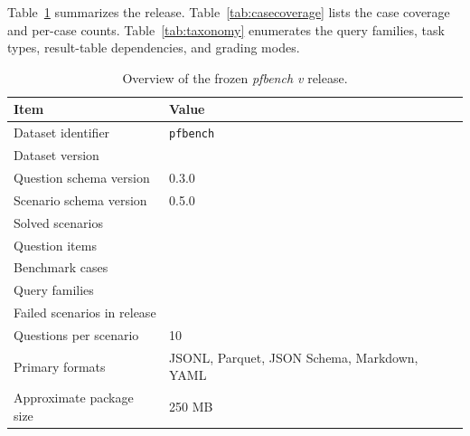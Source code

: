 Table~\ref{tab:overview} summarizes the release. Table~\ref{tab:casecoverage} lists the case coverage and per-case counts. Table~\ref{tab:taxonomy} enumerates the query families, task types, result-table dependencies, and grading modes.

\begin{table}[!t]
\caption{Overview of the frozen \textit{pfbench v\datasetversion} release.}
\label{tab:overview}
\centering
\begin{tabular}{p{}p{}}
\toprule
Item & Value \\
\midrule
Dataset identifier & \texttt{pfbench} \\
Dataset version & \datasetversion{} \\
Question schema version & 0.3.0 \\
Scenario schema version & 0.5.0 \\
Solved scenarios & \datasetscenarios{} \\
Question items & \datasetquestions{} \\
Benchmark cases & \datasetcases{} \\
Query families & \datasetfamilies{} \\
Failed scenarios in release & \datasetfails{} \\
Questions per scenario & 10 \\
Primary formats & JSONL, Parquet, JSON Schema, Markdown, YAML \\
Approximate package size & 250 MB \\
\bottomrule
\end{tabular}
\end{table}

\begin{table}[!t]
\caption{Case coverage in the frozen release.}
\label{tab:casecoverage}
\centering
{}
\end{table}

